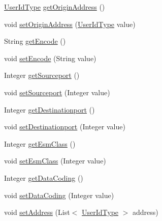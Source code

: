 \begin{DoxyCompactItemize}
\hyperlink{classcom_1_1telefonica_1_1schemas_1_1unica_1_1rest_1_1common_1_1v1_1_1UserIdType}{UserIdType} \hyperlink{classcom_1_1telefonica_1_1schemas_1_1unica_1_1rest_1_1sms_1_1v1_1_1SMSTextType_a7a4da0c914d152dbaacc2062f1a41514}{getOriginAddress} ()
\item 
void \hyperlink{classcom_1_1telefonica_1_1schemas_1_1unica_1_1rest_1_1sms_1_1v1_1_1SMSTextType_a8ca4b9d15f5bf6d8c6142c865191c0c8}{setOriginAddress} (\hyperlink{classcom_1_1telefonica_1_1schemas_1_1unica_1_1rest_1_1common_1_1v1_1_1UserIdType}{UserIdType} value)
\item 
String \hyperlink{classcom_1_1telefonica_1_1schemas_1_1unica_1_1rest_1_1sms_1_1v1_1_1SMSTextType_a6144febb396aa973781b756acaec3601}{getEncode} ()
\item 
void \hyperlink{classcom_1_1telefonica_1_1schemas_1_1unica_1_1rest_1_1sms_1_1v1_1_1SMSTextType_ac51212634bf0f46bd6b0487beda254d6}{setEncode} (String value)
\item 
Integer \hyperlink{classcom_1_1telefonica_1_1schemas_1_1unica_1_1rest_1_1sms_1_1v1_1_1SMSTextType_a7c72bf05616c7c24e8605615e4bc7529}{getSourceport} ()
\item 
void \hyperlink{classcom_1_1telefonica_1_1schemas_1_1unica_1_1rest_1_1sms_1_1v1_1_1SMSTextType_a5500101bf6a7c465a565425c3ec7937e}{setSourceport} (Integer value)
\item 
Integer \hyperlink{classcom_1_1telefonica_1_1schemas_1_1unica_1_1rest_1_1sms_1_1v1_1_1SMSTextType_a8c59b490f690bda41e21bfac893d7a0b}{getDestinationport} ()
\item 
void \hyperlink{classcom_1_1telefonica_1_1schemas_1_1unica_1_1rest_1_1sms_1_1v1_1_1SMSTextType_a2070204437e7c7c99490ddc8434784a4}{setDestinationport} (Integer value)
\item 
Integer \hyperlink{classcom_1_1telefonica_1_1schemas_1_1unica_1_1rest_1_1sms_1_1v1_1_1SMSTextType_a3abac7bc5ddbf8d93941e1abbe1f2157}{getEsmClass} ()
\item 
void \hyperlink{classcom_1_1telefonica_1_1schemas_1_1unica_1_1rest_1_1sms_1_1v1_1_1SMSTextType_a89c6bf9d3c1d569d51faca239b6f3306}{setEsmClass} (Integer value)
\item 
Integer \hyperlink{classcom_1_1telefonica_1_1schemas_1_1unica_1_1rest_1_1sms_1_1v1_1_1SMSTextType_ac14f8a93a446fcc5a53eeba82da99039}{getDataCoding} ()
\item 
void \hyperlink{classcom_1_1telefonica_1_1schemas_1_1unica_1_1rest_1_1sms_1_1v1_1_1SMSTextType_a2ed3f168db5f6bce01d25d3fa5167618}{setDataCoding} (Integer value)
\item 
void \hyperlink{classcom_1_1telefonica_1_1schemas_1_1unica_1_1rest_1_1sms_1_1v1_1_1SMSTextType_a78ea132148afddbb9b85d881ca6a29e4}{setAddress} (List$<$ \hyperlink{classcom_1_1telefonica_1_1schemas_1_1unica_1_1rest_1_1common_1_1v1_1_1UserIdType}{UserIdType} $>$ address)
\end{DoxyCompactItemize}
